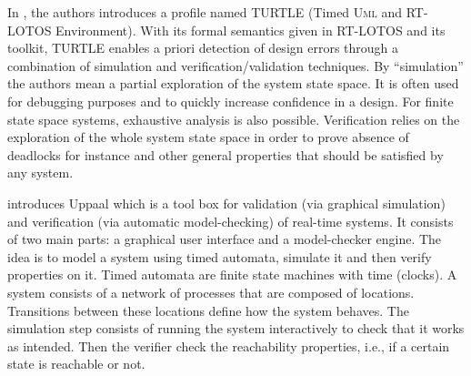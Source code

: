 \documentclass[a4paper,twoside]{article}
\def\sysml{\textsc{SysML}}
\def\UML{\textsc{Uml}}
\def\uml{\textsc{Uml}}
\begin{document}
In \cite{test11}, the authors introduces a profile named TURTLE (Timed \UML{} and RT-LOTOS Environment). With its formal semantics given in RT-LOTOS and its toolkit, TURTLE enables a priori detection of design errors through a combination of simulation and verification/validation techniques. By “simulation” the authors mean a partial exploration of the system state space. It is often used for debugging purposes and to quickly increase confidence in a design. For finite state space systems, exhaustive analysis is also possible. Verification relies 
on the exploration of the whole system state space in order to prove absence of deadlocks for instance and other general properties that should be satisfied by any system.


\cite{test12} introduces Uppaal which is a tool box for validation (via graphical simulation) and verification (via automatic model-checking) of real-time systems. It consists of two main parts: a graphical user interface and a model-checker engine. The idea is to model a system using timed automata, simulate it and then verify properties on it. Timed automata are finite state machines with time (clocks). A system consists of a network of processes that are composed of locations. Transitions between these locations define how the system behaves. The simulation step consists of running the system interactively to check that it works as intended. Then the verifier check the reachability properties, i.e., if a certain state is reachable or not. 




\end{document}
